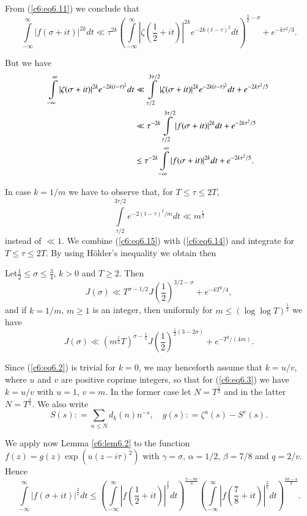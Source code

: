 From (\ref{c6:eq6.11}) we conclude that
{\fontsize{10pt}{12pt}\selectfont
\begin{equation}
\int\limits^\infty_{-\infty} |f(\sigma + it)|^{2k} dt \ll \tau^{2k}
\left(\int\limits^\infty_{-\infty} \left|\zeta \left(\frac{1}{2} + it
\right)\right|^{2k}e^{-2k(t-\tau)^2} dt \right)^{\frac{3}{2} - \sigma} +
e^{-k\tau^2/3}. \label{c6:eq6.14}
\end{equation}}

But we have
\begin{align}
\int\limits^\infty_{-\infty} |\zeta(\sigma + it)|^{2k} e^{-2k
  (t-\tau)^2} dt &\ll \int\limits^{3\tau/2}_{\tau/2} |\zeta(\sigma +
it)|^{2k} e^{-2k (t - \tau)^2} dt + e^{-2k\tau^2/5}\notag \\ 
& \ll \tau^{-2k} \int\limits^{3\tau/2}_{\tau/2} |f(\sigma + it)|^{2k}
dt + e^{-2k\tau^2/5} \label{c6:eq6.15}\\
& \leq \tau^{-2k} \int\limits^\infty_{-\infty} |f(\sigma + it)|^{2k} dt
+ e^{-2k\tau^2/5}.\notag 
\end{align}

In case $k = 1/m$ we have to observe that, for $T \leq \tau \leq 2T$,  
$$
\int\limits^{3\tau/2}_{\tau/2} e^{-2(t-\tau)^2/m} dt \ll
m^{\frac{1}{2}} 
$$
instead of $\ll 1$. We combine (\ref{c6:eq6.15}) with
(\ref{c6:eq6.14}) and integrate for $T \leq \tau \leq 2T$. By using
H\"older's inequality we obtain then  

\begin{lemma}\label{c6:lem6.5}
Let\pageoriginale $\frac{1}{2} \leq \sigma \leq \frac{3}{4}$, $k>0$
and $T \geq 2$. Then 
$$
J(\sigma) \ll T^{\sigma -1/2} J \left(\frac{1}{2} \right)^{3/2 -
  \sigma} + e^{-kT^2/4}, 
$$
and if $k =1/m$, $m \geq 1$ is an integer, then uniformly for $m \leq
(\log \log T)^{\frac{1}{2}}$ we have  
$$
J(\sigma) \ll \left(m^{\frac{1}{2} }T\right)^{\sigma-\frac{1}{2}}
J\left(\frac{1}{2}\right)^{\frac{1}{2}(3-2\sigma)} + e^{-T^2 / (4m)}. 
$$
\end{lemma}

Since (\ref{c6:eq6.2}) is trivial for $k=0$, we may henceforth assume
that $k=u/v$, where $u$ and $v$ are positive coprime integers, so that
for (\ref{c6:eq6.3}) we have $k = u/v$ with $u=1$, $v = m$. In the
former case let $N=T^{\frac{1}{2}}$ and in the latter $N =
T^{\frac{3}{4}}$. We also write 
$$
S(s) : = \sum\limits_{n \leq N} d_k (n) n^{-s},\quad g(s): = \zeta^u(s) -
S^v (s). 
$$

We apply now Lemma \ref{c6:lem6.2} to the function $f(z) = g(z) \exp
(u(z-i\tau)^2)$ with $\gamma =\sigma$, $\alpha = 1/2$, $\beta = 7/8$
and $q = 2 /v$. Hence 
{\fontsize{10pt}{12pt}\selectfont
\begin{equation}
\int\limits^\infty_{-\infty} |f(\sigma + it)|^{\frac{2}{v}} dt \leq
\left(\int\limits^\infty_{-\infty} \left|f \left(\frac{1}{2} + it
\right)\right|^{\frac{2}{v}} dt \right)^{\frac{7-8\sigma}{3}}
\left(\int\limits^\infty_{-\infty} \left|f \left(\frac{7}{8} + it
\right)\right|^{\frac{2}{v}} dt \right)^{\frac{8\sigma - 4}{3}}.
\label{c6:eq6.16} 
\end{equation}}

